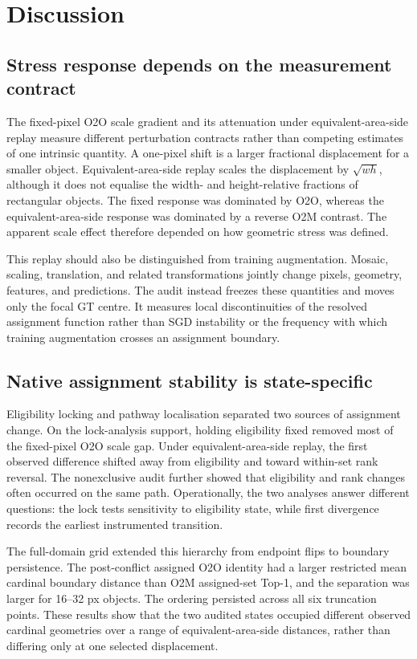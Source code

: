 \section{Discussion}

\subsection{Stress response depends on the measurement contract}

The fixed-pixel O2O scale gradient and its attenuation under equivalent-area-side replay measure different perturbation contracts rather than competing estimates of one intrinsic quantity. A one-pixel shift is a larger fractional displacement for a smaller object. Equivalent-area-side replay scales the displacement by $\sqrt{wh}$, although it does not equalise the width- and height-relative fractions of rectangular objects. The fixed response was dominated by O2O, whereas the equivalent-area-side response was dominated by a reverse O2M contrast. The apparent scale effect therefore depended on how geometric stress was defined.

This replay should also be distinguished from training augmentation. Mosaic, scaling, translation, and related transformations jointly change pixels, geometry, features, and predictions. The audit instead freezes these quantities and moves only the focal GT centre. It measures local discontinuities of the resolved assignment function rather than SGD instability or the frequency with which training augmentation crosses an assignment boundary.

\subsection{Native assignment stability is state-specific}

Eligibility locking and pathway localisation separated two sources of assignment change. On the lock-analysis support, holding eligibility fixed removed most of the fixed-pixel O2O scale gap. Under equivalent-area-side replay, the first observed difference shifted away from eligibility and toward within-set rank reversal. The nonexclusive audit further showed that eligibility and rank changes often occurred on the same path. Operationally, the two analyses answer different questions: the lock tests sensitivity to eligibility state, while first divergence records the earliest instrumented transition.

The full-domain grid extended this hierarchy from endpoint flips to boundary persistence. The post-conflict assigned O2O identity had a larger restricted mean cardinal boundary distance than O2M assigned-set Top-1, and the separation was larger for 16--32 px objects. The ordering persisted across all six truncation points. These results show that the two audited states occupied different observed cardinal geometries over a range of equivalent-area-side distances, rather than differing only at one selected displacement.

